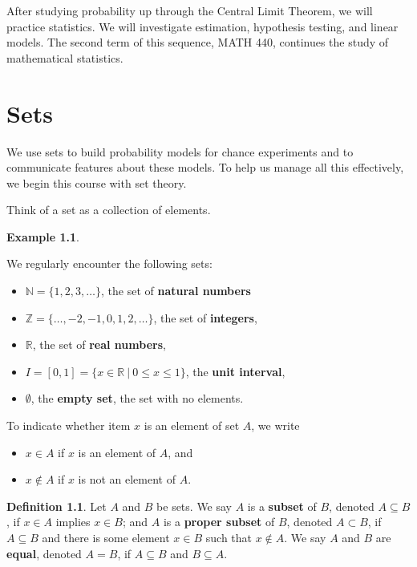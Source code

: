 \documentclass[
]{book}
\providecommand{\tightlist}{%
  \setlength{\itemsep}{0pt}\setlength{\parskip}{0pt}}
\theoremstyle{definition}
\newtheorem{definition}{Definition}[chapter]
\theoremstyle{definition}
\newtheorem{example}{Example}[chapter]
\theoremstyle{definition}
\theoremstyle{definition}
\theoremstyle{remark}
\begin{document}
After studying probability up through the Central Limit Theorem, we will practice statistics. We will investigate estimation, hypothesis testing, and linear models. The second term of this sequence, MATH 440, continues the study of mathematical statistics.

\chapter{Sets}\label{sets}

We use sets to build probability models for chance experiments and to communicate features about these models. To help us manage all this effectively, we begin this course with set theory.

Think of a set as a collection of elements.

\begin{example}
\protect\hypertarget{exm:common-sets}{}\label{exm:common-sets}

We regularly encounter the following sets:

\begin{itemize}
\tightlist
\item
  \(\mathbb{N} = \{1, 2, 3, \ldots \}\), the set of \textbf{natural numbers}
\item
  \(\mathbb{Z} = \{\ldots,-2, -1, 0, 1, 2, \ldots \}\), the set of \textbf{integers},
\item
  \(\mathbb{R}\), the set of \textbf{real numbers},
\item
  \(I = [0,1] = \{x \in \mathbb{R}~|~0 \leq x \leq 1\}\), the \textbf{unit interval},
\item
  \(\emptyset\), the \textbf{empty set}, the set with no elements.
\end{itemize}

\end{example}

To indicate whether item \(x\) is an element of set \(A\), we write

\begin{itemize}
\tightlist
\item
  \(x \in A\) if \(x\) is an element of \(A\), and
\item
  \(x \notin A\) if \(x\) is not an element of \(A\).
\end{itemize}

\begin{definition}
\protect\hypertarget{def:subset}{}\label{def:subset}Let \(A\) and \(B\) be sets.
We say \(A\) is a \textbf{subset} of \(B\), denoted \(A \subseteq B\), if \(x \in A\) implies \(x \in B\); and \(A\) is a \textbf{proper subset} of \(B\), denoted \(A \subset B\), if \(A \subseteq B\) and there is some element \(x \in B\) such that \(x \notin A\). We say \(A\) and \(B\) are \textbf{equal}, denoted \(A = B\), if \(A \subseteq B\) and \(B \subseteq A\).
\end{definition}
\end{document}
